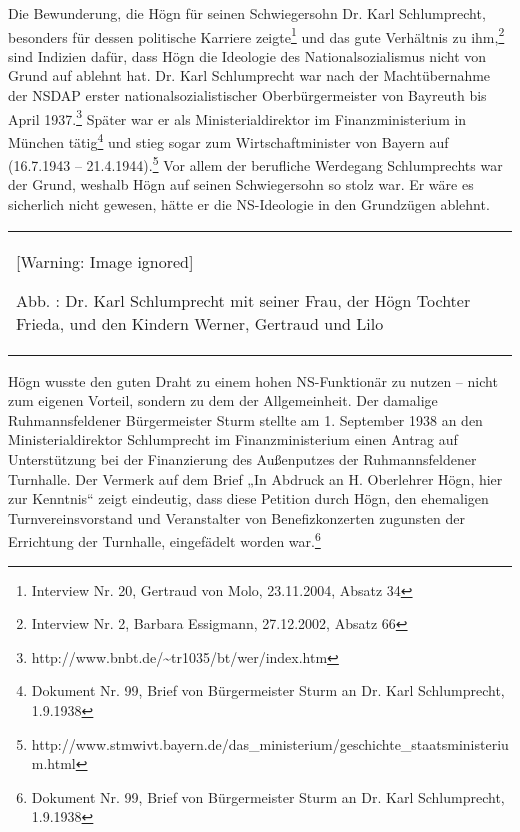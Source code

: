 \documentclass[a4paper]{article}
\newcounter{Abb}
\renewcommand\theAbb{\arabic{Abb}}
\begin{document}
Die Bewunderung, die Högn für seinen Schwiegersohn Dr. Karl
Schlumprecht, besonders für dessen politische Karriere zeigte\footnote{
Interview Nr. 20, Gertraud von Molo, 23.11.2004, Absatz 34} und das
gute Verhältnis zu ihm,\footnote{ Interview Nr. 2, Barbara Essigmann,
27.12.2002, Absatz 66} sind Indizien dafür, dass Högn die Ideologie des
Nationalsozialismus nicht von Grund auf ablehnt hat. Dr. Karl
Schlumprecht war nach der Machtübernahme der NSDAP erster
nationalsozialistischer Oberbürgermeister von Bayreuth bis April
1937.\footnote{ http://www.bnbt.de/\~{}tr1035/bt/wer/index.htm} Später
war er als Ministerialdirektor im Finanzministerium in München
tätig\footnote{ Dokument Nr. 99, Brief von Bürgermeister Sturm an Dr.
Karl Schlumprecht, 1.9.1938} und stieg sogar zum Wirtschaftminister von
Bayern auf (16.7.1943 – 21.4.1944).\footnote{
http://www.stmwivt.bayern.de/das\_ministerium/geschichte\_staatsministerium.html}
Vor allem der berufliche Werdegang Schlumprechts war der Grund, weshalb
Högn auf seinen Schwiegersohn so stolz war. Er wäre es sicherlich nicht
gewesen, hätte er die NS-Ideologie in den Grundzügen ablehnt.

\begin{center}
\begin{minipage}{6.969cm}
\begin{flushleft}
\tablefirsthead{}
\tablehead{}
\tabletail{}
\tablelasttail{}
\begin{supertabular}{m{6.769cm}}
  [Warning: Image ignored] %
 
Abb. \stepcounter{Abb}{\theAbb}: Dr. Karl Schlumprecht mit seiner Frau,
der Högn Tochter Frieda, und den Kindern Werner, Gertraud und Lilo\\
\end{supertabular}
\end{flushleft}
\end{minipage}
\end{center}
Högn wusste den guten Draht zu einem hohen NS-Funktionär zu nutzen –
nicht zum eigenen Vorteil, sondern zu dem der Allgemeinheit. Der
damalige Ruhmannsfeldener Bürgermeister Sturm stellte am 1. September
1938 an den Ministerialdirektor Schlumprecht im Finanzministerium einen
Antrag auf Unterstützung bei der Finanzierung des Außenputzes der
Ruhmannsfeldener Turnhalle. Der Vermerk auf dem Brief „In Abdruck an H.
Oberlehrer Högn, hier zur Kenntnis“ zeigt eindeutig, dass diese
Petition durch Högn, den ehemaligen Turnvereinsvorstand und
Veranstalter von Benefizkonzerten zugunsten der Errichtung der
Turnhalle, eingefädelt worden war.\footnote{ Dokument Nr. 99, Brief von
Bürgermeister Sturm an Dr. Karl Schlumprecht, 1.9.1938}
\end{document}
